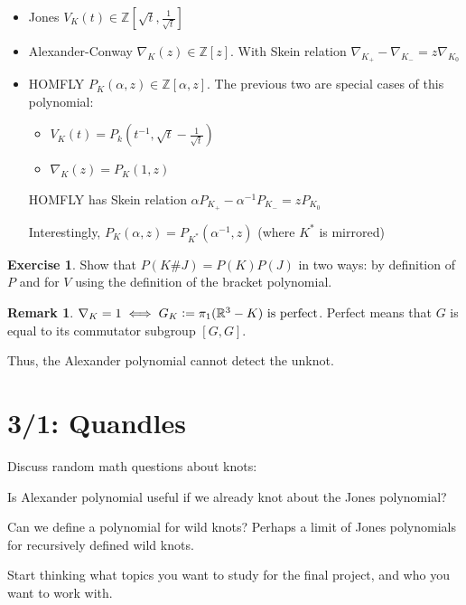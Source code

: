 \documentclass[11pt]{article}
\newcommand{\Z}{\mathbb{Z}}
\newcommand{\R}{\mathbb{R}}
\newcommand{\defeq}{\vcentcolon=}
\theoremstyle{plain}
\theoremstyle{definition}
\newtheorem{remark}{Remark}
\newtheorem{exercise}{Exercise}
\begin{document}
\begin{itemize}
  \item Jones $V_K(t) \in \Z[\sqrt{t}, \frac{1}{\sqrt{t}}]$
  \item Alexander-Conway $\nabla_K(z) \in \Z[z]$. With Skein relation $\nabla_{K_+} - \nabla_{K_-} = z \nabla_{K_0}$
  \item HOMFLY $P_K(\alpha, z) \in \Z[\alpha, z]$. The previous two are special cases of this polynomial:

    \begin{itemize}
      \item $V_K(t) = P_k(t^{-1}, \sqrt{t} - \frac{1}{\sqrt{t}})$
      \item $\nabla_K(z) = P_K(1, z)$
    \end{itemize}

    HOMFLY has Skein relation $\alpha P_{K_+} - \alpha^{-1} P_{K_-} = z P_{K_0}$

    Interestingly, $P_K(\alpha, z) = P_{K^\ast}(\alpha^{-1}, z)$ (where $K^\ast$ is mirrored)
\end{itemize}



\begin{exercise}
  Show that $P(K \# J) = P(K) P(J)$ in two ways: by definition of $P$ and for $V$ using the definition of the bracket polynomial.
\end{exercise}


\begin{remark}
  $\nabla_K = 1 \iff G_K \defeq \pi_1(\R^3 - K) \text{ is perfect}$. Perfect means that $G$ is equal to its commutator subgroup $[G,G]$.

 Thus, the Alexander polynomial cannot detect the unknot.
\end{remark}



\clearpage
\section{3/1: Quandles}

Discuss random math questions about knots:

 Is Alexander polynomial useful if we already knot about the Jones polynomial?

 Can we define a polynomial for wild knots? Perhaps a limit of Jones polynomials for recursively defined wild knots.


\bigskip
Start thinking what topics you want to study for the final project, and who you want to work with.
\end{document}
